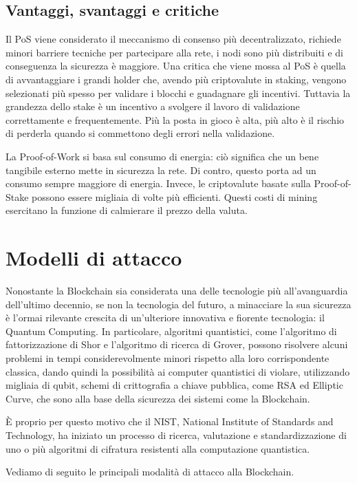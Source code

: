 \subsection{Vantaggi, svantaggi e critiche}
Il PoS viene considerato il meccanismo di consenso più decentralizzato, richiede minori barriere tecniche per partecipare alla rete, i nodi sono più distribuiti e di conseguenza la sicurezza è maggiore. Una critica che viene mossa al PoS è quella di avvantaggiare i grandi holder che, avendo più criptovalute in staking, vengono selezionati più spesso per validare i blocchi e guadagnare gli incentivi. Tuttavia la grandezza dello stake è un incentivo a svolgere il lavoro di validazione correttamente e frequentemente. Più la posta in gioco è alta, più alto è il rischio di perderla quando si commettono degli errori nella validazione.

La Proof-of-Work si basa sul consumo di energia: ciò significa che un bene tangibile esterno mette in sicurezza la rete. Di contro, questo porta ad un consumo sempre maggiore di energia. Invece, le criptovalute basate sulla Proof-of-Stake possono essere migliaia di volte più efficienti. Questi costi di mining esercitano la funzione di calmierare il prezzo della valuta.

\section{Modelli di attacco}
Nonostante la Blockchain sia considerata una delle tecnologie più all'avanguardia dell'ultimo decennio, se non la tecnologia del futuro, a minacciare la sua sicurezza è l'ormai rilevante crescita di un'ulteriore innovativa e fiorente tecnologia: il Quantum Computing. In particolare, algoritmi quantistici, come l'algoritmo di fattorizzazione di Shor e l'algoritmo di ricerca di Grover, possono risolvere alcuni problemi in tempi considerevolmente minori rispetto alla loro corrispondente classica, dando quindi la possibilità ai computer quantistici di violare, utilizzando migliaia di qubit, schemi di crittografia a chiave pubblica, come RSA ed Elliptic Curve, che sono alla base della sicurezza dei sistemi come la Blockchain.

È proprio per questo motivo che il NIST, National Institute of Standards and Technology, ha iniziato un processo di ricerca, valutazione e standardizzazione di uno o più algoritmi di cifratura resistenti alla computazione quantistica.

Vediamo di seguito le principali modalità di attacco alla Blockchain.

